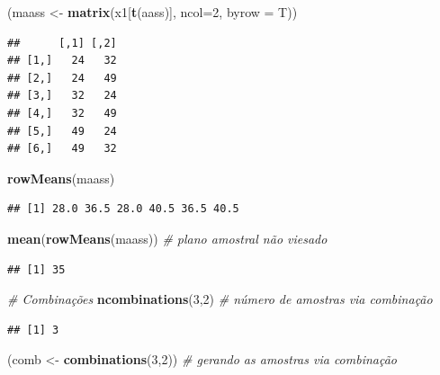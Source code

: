\documentclass[
]{book}
\newenvironment{Shaded}{\begin{snugshade}}{\end{snugshade}}
\newcommand{\CommentTok}[1]{\textcolor[rgb]{0.56,0.35,0.01}{\textit{#1}}}
\newcommand{\DataTypeTok}[1]{\textcolor[rgb]{0.13,0.29,0.53}{#1}}
\newcommand{\DecValTok}[1]{\textcolor[rgb]{0.00,0.00,0.81}{#1}}
\newcommand{\KeywordTok}[1]{\textcolor[rgb]{0.13,0.29,0.53}{\textbf{#1}}}
\newcommand{\NormalTok}[1]{#1}
\newcommand{\StringTok}[1]{\textcolor[rgb]{0.31,0.60,0.02}{#1}}
\theoremstyle{definition}
\theoremstyle{definition}
\theoremstyle{definition}
\theoremstyle{remark}
\begin{document}
\begin{Shaded}
\begin{Highlighting}[]
\NormalTok{(maass \textless{}{-}}\StringTok{ }\KeywordTok{matrix}\NormalTok{(x1[}\KeywordTok{t}\NormalTok{(aass)], }\DataTypeTok{ncol=}\DecValTok{2}\NormalTok{, }\DataTypeTok{byrow =}\NormalTok{ T))}
\end{Highlighting}
\end{Shaded}

\begin{verbatim}
##      [,1] [,2]
## [1,]   24   32
## [2,]   24   49
## [3,]   32   24
## [4,]   32   49
## [5,]   49   24
## [6,]   49   32
\end{verbatim}

\begin{Shaded}
\begin{Highlighting}[]
\KeywordTok{rowMeans}\NormalTok{(maass)}
\end{Highlighting}
\end{Shaded}

\begin{verbatim}
## [1] 28.0 36.5 28.0 40.5 36.5 40.5
\end{verbatim}

\begin{Shaded}
\begin{Highlighting}[]
\KeywordTok{mean}\NormalTok{(}\KeywordTok{rowMeans}\NormalTok{(maass)) }\CommentTok{\# plano amostral não viesado}
\end{Highlighting}
\end{Shaded}

\begin{verbatim}
## [1] 35
\end{verbatim}

\begin{Shaded}
\begin{Highlighting}[]
\CommentTok{\# Combinações}
\KeywordTok{ncombinations}\NormalTok{(}\DecValTok{3}\NormalTok{,}\DecValTok{2}\NormalTok{) }\CommentTok{\# número de amostras via combinação}
\end{Highlighting}
\end{Shaded}

\begin{verbatim}
## [1] 3
\end{verbatim}

\begin{Shaded}
\begin{Highlighting}[]
\NormalTok{(comb \textless{}{-}}\StringTok{ }\KeywordTok{combinations}\NormalTok{(}\DecValTok{3}\NormalTok{,}\DecValTok{2}\NormalTok{)) }\CommentTok{\# gerando as amostras via combinação}
\end{Highlighting}
\end{Shaded}
\end{document}
